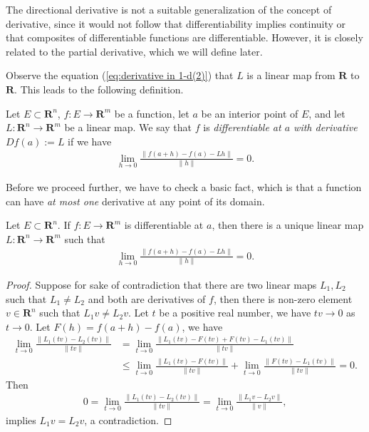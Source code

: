 The directional derivative is not a suitable generalization of the concept of derivative, since it would not follow that differentiability implies continuity or that composites of differentiable functions are differentiable. However, it is closely related to the partial derivative, which we will define later.

Observe the equation (\ref{eq:derivative in 1-d(2)}) that $L$ is a linear map from $\mathbf{R}$ to $\mathbf{R}$. This leads to the following definition.

\begin{definition}[Differentiability]
    Let $E \subset \mathbf{R}^n$, $f : E \to \mathbf{R}^m$ be a function, let $a$ be an interior point of $E$, and let $L : \mathbf{R}^n \to \mathbf{R}^m$ be a linear map. We say that $f$ is \emph{differentiable at $a$ with derivative $Df(a) := L$} if we have
    \begin{align*}
        \lim_{h \to 0}\frac{\|f(a + h) - f(a) - Lh\|}{\|h\|} = 0.
    \end{align*}
\end{definition}

Before we proceed further, we have to check a basic fact, which is that a function can have \emph{at most one} derivative at any point of its domain.

\begin{lemma}
    Let $E \subset \mathbf{R}^n$. If $f : E \to \mathbf{R}^m$ is differentiable at $a$, then there is a unique linear map $L : \mathbf{R}^n \to \mathbf{R}^m$ such that
    \begin{align*}
        \lim_{h \to 0}\frac{\|f(a + h) - f(a) - Lh\|}{\|h\|} = 0.
    \end{align*}
\end{lemma}

\begin{proof}
    Suppose for sake of contradiction that there are two linear maps $L_1, L_2$ such that $L_1 \neq L_2$ and both are derivatives of $f$, then there is non-zero element $v \in \mathbf{R}^n$ such that $L_1v \neq L_2v$. Let $t$ be a positive real number, we have $tv \to 0$ as $t \to 0$. Let $F(h) = f(a + h) - f(a)$, we have
        \begin{align*}
            \lim_{t \to 0}\frac{\|L_1(tv) - L_2(tv)\|}{\|tv\|}
            &= \lim_{t \to 0}\frac{\|L_1(tv) - F(tv) + F(tv) - L_1(tv)\|}{\|tv\|}\\
            &\leq \lim_{t \to 0}\frac{\|L_1(tv) - F(tv)\|}{\|tv\|} + \lim_{t \to 0}\frac{\|F(tv) - L_1(tv)\|}{\|tv\|}
            = 0.
        \end{align*}
Then
        \begin{align*}
            0 = \lim_{t \to 0}\frac{\|L_1(tv) - L_2(tv)\|}{\|tv\|}
            = \lim_{t \to 0}\frac{\|L_1v - L_2v\|}{\|v\|},
        \end{align*}
implies $L_1v = L_2v$, a contradiction.
\end{proof}

